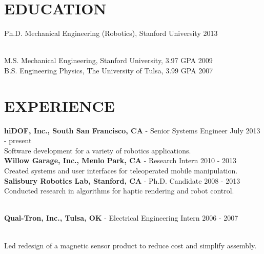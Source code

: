 \documentclass[line,margin]{res}
\newcommand{\CVOnly}[1]{}
\newcommand{\CVOnly}[1]{#1}
\begin{document}
\address{469 Homer Ave, Palo Alto, CA 94301}
\address{650.762.6844}
\address{adamleeper@gmail.com} 
\address{www.adamleeper.com}

 
\begin{resume}
 
\section{EDUCATION}
\vspace{1.0pc}
Ph.D. Mechanical Engineering (Robotics), Stanford University 
\hfill 2013%
\CVOnly{ {\small
\\[0.0pc]Advisor: Prof. Kenneth Salisbury
\\[0.0pc]Thesis: Robot Telemanipulation in Unstructured Environments: Sensors, Algorithms, Interfaces.
\\[-0.6pc]} }
%
\\[0.0pc]M.S. Mechanical Engineering, Stanford University, 3.97 GPA \hfill  2009 
\\[0.0pc] B.S. Engineering Physics, The University of Tulsa, 3.99 GPA \hfill 2007 
%
%
\section{EXPERIENCE} 
\vspace{1.0pc}
{\bf hiDOF, Inc., South San Francisco, CA } - Senior Systems Engineer \hfill July 2013 - present
\\[0.0pc]Software development for a variety of robotics applications.
%
\\[0.4pc]{\bf Willow Garage, Inc., Menlo Park, CA } - Research Intern \hfill 2010 - 2013
\\[0.0pc]Created systems and user interfaces for teleoperated mobile manipulation.
%
\\[0.4pc]{\bf Salisbury Robotics Lab, Stanford, CA } - Ph.D. Candidate \hfill 2008 - 2013
\\[0.0pc]Conducted research in algorithms for haptic rendering and robot control.
\CVOnly{\\[0.0pc]Implemented miniature stereo camera sensor hardware for a robot gripper.}
%
\\[0.4pc]{\bf Qual-Tron, Inc., Tulsa, OK} - Electrical Engineering Intern \hfill 2006 - 2007
\CVOnly{\\[0.0pc] Designed and implemented test procedures for IR and magnetic sensor products. }
\\[0.0pc]Led redesign of a magnetic sensor product to reduce cost and simplify assembly.
%
%

\end{resume}
\end{document}
